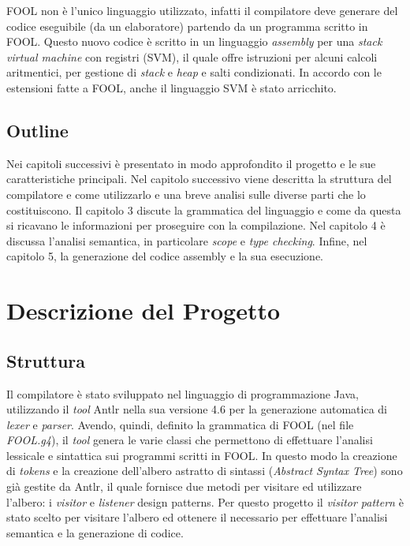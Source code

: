\documentclass{scrreprt}
\begin{document}
FOOL non è l'unico linguaggio utilizzato, infatti il compilatore deve generare del codice eseguibile (da un elaboratore) partendo da un programma scritto in FOOL. Questo nuovo codice è scritto in un linguaggio \textit{assembly} per una \textit{stack virtual machine} con registri (SVM), il quale offre istruzioni per alcuni calcoli aritmentici, per gestione di \textit{stack} e \textit{heap} e salti condizionati. In accordo con le estensioni fatte a FOOL, anche il linguaggio SVM è stato arricchito.

\section{Outline}
Nei capitoli successivi è presentato in modo approfondito il progetto e le sue caratteristiche principali. Nel capitolo successivo viene descritta la struttura del compilatore e come utilizzarlo e una breve analisi sulle diverse parti che lo costituiscono. 
Il capitolo 3 discute la grammatica del linguaggio e come da questa si ricavano le informazioni per proseguire con la compilazione. Nel capitolo 4 è discussa l'analisi semantica, in particolare \textit{scope} e \textit{type checking}. Infine, nel capitolo 5, la generazione del codice assembly e la sua esecuzione.

\chapter{Descrizione del Progetto}
\section{Struttura}
Il compilatore è stato sviluppato nel linguaggio di programmazione Java, utilizzando il \textit{tool} Antlr nella sua versione 4.6 per la generazione automatica di \textit{lexer} e \textit{parser}.
Avendo, quindi, definito la grammatica di FOOL (nel file \textit{FOOL.g4}), il \textit{tool} genera le varie classi che permettono di effettuare l'analisi lessicale e sintattica sui programmi scritti in FOOL.
In questo modo la creazione di \textit{tokens} e la creazione dell'albero astratto di sintassi (\textit{Abstract Syntax Tree}) sono già gestite da Antlr, il quale fornisce due metodi per visitare ed utilizzare l'albero: i \textit{visitor} e \textit{listener} design patterns.
Per questo progetto il \textit{visitor pattern} è stato scelto per visitare l'albero ed ottenere il necessario per effettuare l'analisi semantica e la generazione di codice.
\end{document}
